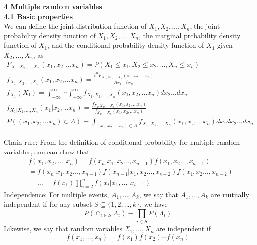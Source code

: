 \documentclass[10pt,a4paper,oneside]{beamer}
\begin{document}
\begin{frame}
\vspace{0.3cm}
{\bfseries 4 Multiple random variables} 
\vspace{0.3cm}
\\{\bfseries 4.1 Basic properties}
\vspace{0.2cm}
\\We can define the joint distribution function of $X_1, X_2,...,X_n$, the joint probability density function of $X_1, X_2,...,X_n$, the marginal probability density function of $X_1$, and the conditional probability density function of $X_1$ given $X_2,...,X_n$, as
\begin{gather*} 
F_{X_{1}, X_{2}, \ldots, X_{n}}\left(x_{1}, x_{2}, \ldots x_{n}\right)=P\left(X_{1} \leqslant x_{1}, X_{2} \leqslant x_{2}, \ldots, X_{n} \leqslant x_{n}\right)
\\ f_{X_{1}, X_{2}, \ldots, X_{n}}\left(x_{1}, x_{2}, \ldots x_{n}\right)=\frac{\partial^{n} F_{X_{1}, X_{2}, \ldots, X_{n}}\left(x_{1}, x_{2}, \ldots x_{n}\right)}{\partial x_{1} \ldots \partial x_{n}}
\\f_{X_{1}}\left(X_{1}\right)=\int_{-\infty}^{\infty} \cdots \int_{-\infty}^{\infty} f_{X_{1}, X_{2}, \ldots, X_{n}}\left(x_{1}, x_{2}, \ldots x_{n}\right) d x_{2} \ldots d x_{n}
\\f_{X_{1} | X_{2}, \ldots, X_{n}}\left(x_{1} | x_{2}, \ldots x_{n}\right)=\frac{f_{X_{1}, X_{2}, \ldots, X_{n}}\left(x_{1}, x_{2}, \ldots x_{n}\right)}{f_{X_{2}, \ldots, X_{n}}\left(x_{1}, x_{2}, \ldots x_{n}\right)}
\\P\left(\left(x_{1}, x_{2}, \ldots x_{n}\right) \in A\right)=\int_{\left(x_{1}, x_{2}, \ldots x_{n}\right) \in A} f_{X_{1}, X_{2}, \ldots, X_{n}}\left(x_{1}, x_{2}, \ldots x_{n}\right) d x_{1} d x_{2} \ldots d x_{n}
\end{gather*}
\end{frame}
\begin{frame}
\vspace{0.3cm}
Chain rule: From the definition of conditional probability for multiple random variables, one can show that
\begin{align*} 
	&f\left(x_{1}, x_{2}, \ldots, x_{n}\right) =f\left(x_{n} | x_{1}, x_{2} \ldots, x_{n-1}\right) f\left(x_{1}, x_{2} \ldots, x_{n-1}\right) \\ &=f\left(x_{n} | x_{1}, x_{2} \ldots, x_{n-1}\right) f\left(x_{n-1} | x_{1}, x_{2} \ldots, x_{n-2}\right) f\left(x_{1}, x_{2} \ldots, x_{n-2}\right) \\ &=\ldots = f\left(x_{1}\right) \prod_{i=2}^{n} f\left(x_{i} | x_{1}, \ldots, x_{i-1}\right) 
\end{align*}
Independence: For multiple events, $A_1,...,A_k$, we say that $A_1,...,A_k$ are mutually independent if for any subset $S \subseteq\{1,2, \dots, k\}$, we have
\[
P\left(\cap_{i \in S} A_{i}\right)=\prod_{i \in S} P\left(A_{i}\right)
\]
Likewise, we say that random variables $X_1,...,X_n$ are independent if
\[
f\left(x_{1}, \ldots, x_{n}\right)=f\left(x_{1}\right) f\left(x_{2}\right) \cdots f\left(x_{n}\right)
\]
\end{frame}
\end{document}
